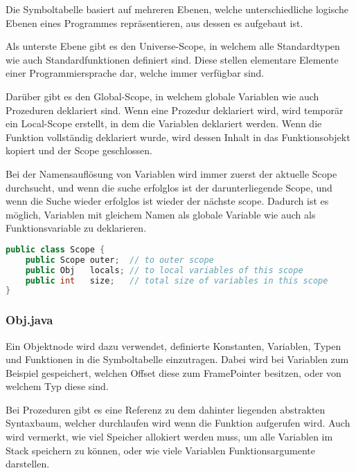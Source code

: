 Die Symboltabelle basiert auf mehreren Ebenen, welche unterschiedliche logische Ebenen eines Programmes repr\"asentieren, aus dessen es aufgebaut ist.

Als unterste Ebene gibt es den Universe-Scope, in welchem alle Standardtypen wie auch Standardfunktionen definiert sind. Diese stellen elementare Elemente einer Programmiersprache dar, welche immer verf\"ugbar sind.

Dar\"uber gibt es den Global-Scope, in welchem globale Variablen wie auch Prozeduren deklariert sind. Wenn eine Prozedur deklariert wird, wird tempor\"ar ein Local-Scope erstellt, in dem die Variablen deklariert werden. Wenn die Funktion vollst\"andig deklariert wurde, wird dessen Inhalt in das Funktionsobjekt kopiert und der Scope geschlossen.

Bei der Namensaufl\"osung von Variablen wird immer zuerst der aktuelle Scope durchsucht, und wenn die suche erfolglos ist der darunterliegende Scope, und wenn die Suche wieder erfolglos ist wieder der n\"achste scope. Dadurch ist es m\"oglich, Variablen mit gleichem Namen als globale Variable wie auch als Funktionsvariable zu deklarieren.

\begin{lstlisting}[language=Java]
public class Scope {
	public Scope outer;  // to outer scope
	public Obj   locals; // to local variables of this scope
	public int   size;   // total size of variables in this scope
}
\end{lstlisting}

\subsubsection{Obj.java}

Ein Objektnode wird dazu verwendet, definierte Konstanten, Variablen, Typen und Funktionen in die Symboltabelle einzutragen. Dabei wird bei Variablen zum Beispiel gespeichert, welchen Offset diese zum FramePointer besitzen, oder von welchem Typ diese sind.

Bei Prozeduren gibt es eine Referenz zu dem dahinter liegenden abstrakten Syntaxbaum, welcher durchlaufen wird wenn die Funktion aufgerufen wird. Auch wird vermerkt, wie viel Speicher allokiert werden muss, um alle Variablen im Stack speichern zu k\"onnen, oder wie viele Variablen Funktionsargumente darstellen.

